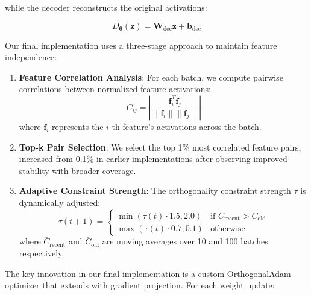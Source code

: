 \documentclass{article} %
\begin{document}
while the decoder reconstructs the original activations:

\begin{equation}
    D_{\boldsymbol{\theta}}(\mathbf{z}) = \mathbf{W}_{\text{dec}}\mathbf{z} + \mathbf{b}_{\text{dec}}
\end{equation}

Our final implementation uses a three-stage approach to maintain feature independence:

\begin{enumerate}
    \item \textbf{Feature Correlation Analysis}: For each batch, we compute pairwise correlations between normalized feature activations:
    \begin{equation}
        C_{ij} = \left|\frac{\mathbf{f}_i^T \mathbf{f}_j}{\|\mathbf{f}_i\| \|\mathbf{f}_j\|}\right|
    \end{equation}
    where $\mathbf{f}_i$ represents the $i$-th feature's activations across the batch.

    \item \textbf{Top-k Pair Selection}: We select the top 1\% most correlated feature pairs, increased from 0.1\% in earlier implementations after observing improved stability with broader coverage.

    \item \textbf{Adaptive Constraint Strength}: The orthogonality constraint strength $\tau$ is dynamically adjusted:
    \begin{equation}
        \tau(t+1) = \begin{cases}
            \min(\tau(t) \cdot 1.5, 2.0) & \text{if } \bar{C}_{\text{recent}} > \bar{C}_{\text{old}} \\
            \max(\tau(t) \cdot 0.7, 0.1) & \text{otherwise}
        \end{cases}
    \end{equation}
    where $\bar{C}_{\text{recent}}$ and $\bar{C}_{\text{old}}$ are moving averages over 10 and 100 batches respectively.
\end{enumerate}

The key innovation in our final implementation is a custom OrthogonalAdam optimizer that extends \cite{kingma2014adam} with gradient projection. For each weight update:
\end{document}
